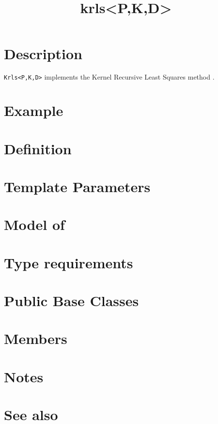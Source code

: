 \documentclass{article}
\begin{document}
\title{krls<P,K,D>}
\maketitle

\section*{Description}

\texttt{Krls<P,K,D>} implements the Kernel Recursive Least Squares method \cite{engel03kernel}.

\section*{Example}
\section*{Definition}
\section*{Template Parameters}
\section*{Model of}
\section*{Type requirements}
\section*{Public Base Classes}
\section*{Members}
\section*{Notes}
\section*{See also}



\end{document}
